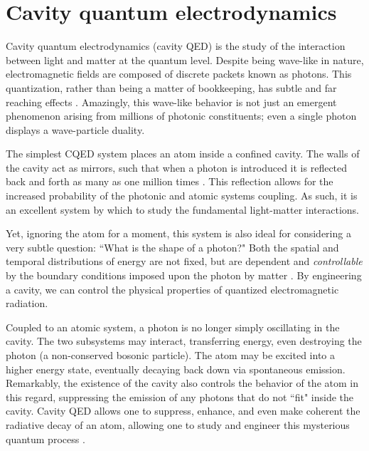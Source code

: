 \documentclass[12 pt]{book}
\begin{document}




\section{Cavity quantum electrodynamics}
Cavity quantum electrodynamics (cavity QED) is the study of the interaction between light and matter at the quantum level. Despite being wave-like in nature, electromagnetic fields are composed of discrete packets known as photons. This quantization, rather than being a matter of bookkeeping, has subtle and far reaching effects \cite{Schuster}. Amazingly, this wave-like behavior is not just an emergent phenomenon arising from millions of photonic constituents; even a single photon displays a wave-particle duality. 

The simplest CQED system places an atom inside a confined cavity. The walls of the cavity act as mirrors, such that when a photon is introduced it is reflected back and forth as many as one million times \cite{Vahala2003}. This reflection allows for the increased probability of the photonic and atomic systems coupling. As such, it is an excellent system by which to study the fundamental light-matter interactions. 

Yet, ignoring the atom for a moment, this system is also ideal for considering a very subtle question: ``What is the shape of a photon?" Both the spatial and temporal distributions of energy are not fixed, but are dependent and \emph{controllable} by the boundary conditions imposed upon the photon by matter \cite{Schuster}. By engineering a cavity, we can control the physical properties of quantized electromagnetic radiation. 

Coupled to an atomic system, a photon is no longer simply oscillating in the cavity. The two subsystems may interact, transferring energy, even destroying the photon (a non-conserved bosonic particle). The atom may be excited into a higher energy state, eventually decaying back down via spontaneous emission. Remarkably, the existence of the cavity also controls the behavior of the atom in this regard, suppressing the emission of any photons that do not ``fit" inside the cavity. Cavity QED allows one to suppress, enhance, and even make coherent the radiative decay of an atom, allowing one to study and engineer this mysterious quantum process \cite{Schuster}.
\end{document}
